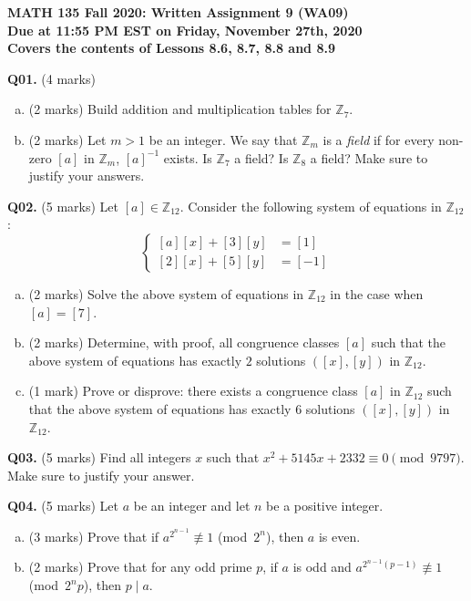 \documentclass[11pt]{article}
\begin{document}
\parindent=0pt

\textbf{MATH 135 Fall 2020: Written Assignment 9 (WA09)\\Due at 11:55 PM EST on Friday, November 27th, 2020\\Covers the contents of Lessons 8.6, 8.7, 8.8 and 8.9}

\textbf{Q01.} (4 marks)

\begin{enumerate}[(a)]
\item (2 marks) Build addition and multiplication tables for $\mathbb Z_7$.

\item (2 marks) Let $m > 1$ be an integer. We say that $\mathbb Z_m$ is a \emph{field} if for every non-zero $[a]$ in $\mathbb Z_m$, $[a]^{-1}$ exists. Is $\mathbb Z_7$ a field? Is $\mathbb Z_8$ a field? Make sure to justify your answers.
\end{enumerate}

\textbf{Q02.} (5 marks) Let $[a] \in \mathbb Z_{12}$. Consider the following system of equations in $\mathbb Z_{12}$:
%
$$
\begin{cases}
[a][x] + [3][y] & = [1]\\
[2][x] + [5][y] & = [-1]
\end{cases}
$$

\begin{enumerate}[(a)]
\item (2 marks) Solve the above system of equations in $\mathbb Z_{12}$ in the case when $[a] = [7]$.

\item (2 marks) Determine, with proof, all congruence classes $[a]$ such that the above system of equations has exactly $2$ solutions $\left([x], [y]\right)$ in $\mathbb Z_{12}$.

\item (1 mark) Prove or disprove: there exists a congruence class $[a]$ in $\mathbb Z_{12}$ such that the above system of equations has exactly $6$ solutions $\left([x], [y]\right)$ in $\mathbb Z_{12}$.
\end{enumerate}

\textbf{Q03.} (5 marks) Find all integers $x$ such that \mbox{$x^2 + 5145x + 2332 \equiv 0 \pmod{9797}$}. Make sure to justify your answer.

\textbf{Q04.} (5 marks) Let $a$ be an integer and let $n$ be a positive integer.

\begin{enumerate}[(a)]
\item (3 marks) Prove that if \mbox{$a^{2^{n - 1}} \not \equiv 1$} \mbox{(mod $2^n$)}, then $a$ is even.

\item (2 marks) Prove that for any odd prime $p$, if $a$ is odd and $a^{2^{n - 1}(p - 1)} \not \equiv 1$ \mbox{(mod $2^np$)}, then $p \mid a$.
\end{enumerate}
\end{document}
